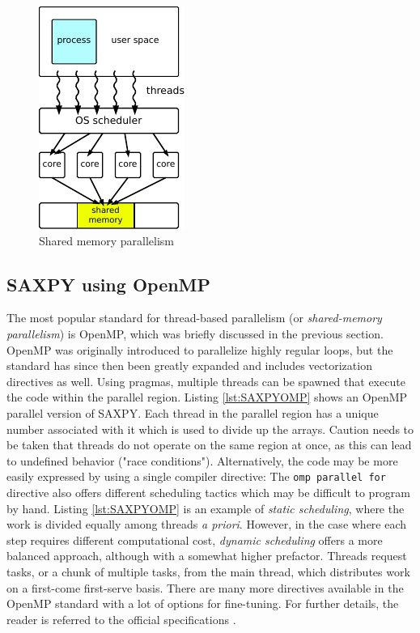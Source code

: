 \begin{figure}[h]
\centering
\includegraphics[scale=1.4]{Pics/shared}
\caption{Shared memory parallelism}
\label{fig:shared}
\end{figure}

\subsection{SAXPY using OpenMP}

The most popular standard for thread-based parallelism (or \emph{shared-memory parallelism}) is OpenMP, which was briefly discussed in the previous section. OpenMP was originally introduced to parallelize highly regular loops, but the standard has since then been greatly expanded and includes vectorization directives as well. Using pragmas, multiple threads can be spawned that execute the code within the parallel region. Listing \ref{lst:SAXPYOMP} shows an OpenMP parallel version of SAXPY. Each thread in the parallel region has a unique number associated with it which is used to divide up the arrays. Caution needs to be taken that threads do not operate on the same region at once, as this can lead to undefined behavior ("race conditions").  
\noindent Alternatively, the code may be more easily expressed by using a single compiler directive:
\noindent The \texttt{omp parallel for} directive also offers different scheduling tactics which may be difficult to program by hand. Listing \ref{lst:SAXPYOMP} is an example of \emph{static scheduling}, where the work is divided equally among threads \emph{a priori}. However, in the case where each step requires different computational cost, \emph{dynamic scheduling} offers a more balanced approach, although with a somewhat higher prefactor. Threads request tasks, or a chunk of multiple tasks, from the main thread, which distributes work on a first-come first-serve basis. There are many more directives available in the OpenMP standard with a lot of options for fine-tuning. For further details, the reader is referred to the official specifications \cite{OMP2021}.

